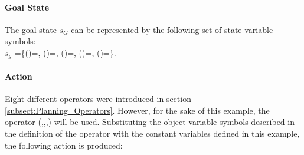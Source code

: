 \begin{comment}
In the initial state $s_0$, the $\mathsf{Robot}$ $\mathrm{r_1}$ is not equipped with any $\mathsf{EndEffector}$ and is not holding anything. The $\mathsf{EndEffectors}$ $\mathrm{eeff_1}$ and $\mathrm{eeff_2}$ are placed in the $\mathsf{EndEffectorHolders}$ $\mathrm{eeffholder_1}$ and $\mathrm{eeffholder_2}$, respectively. The $\mathsf{LargeBoxWithKits}$ $\mathrm{lbwk_1}$ is not full. The $\mathsf{LargeBoxWithEmptyKitTrays}$ $\mathrm{lbwekt_1}$ is not empty. The $\mathsf{PartTrays}$ $\mathrm{pt_A}$, $\mathrm{pt_B}$, and $\mathrm{pt_C}$ are not empty. The $\mathsf{WorkTable}$ $\mathrm{wtable}$ is free of any object.
\end{comment}



\paragraph{Goal State}
\begin{comment}
The goal state $s_g$, the $\mathsf{KitInstance}$ $\mathrm{kins_1}$ contains $\mathsf{Parts}$ $\mathrm{p_{A-1}}$, $\mathrm{p_{A-2}}$, $\mathrm{p_{B-1}}$, and $\mathrm{p_{C-1}}$. The $\mathsf{KitInstance}$ $\mathrm{kins_1}$ is placed in the $\mathsf{LargeBoxWithKits}$ $\mathrm{lbwk_1}$.
\end{comment}
The goal state $s_G$ can be represented by the following set of state variable symbols:\\
$s_g$ =\{()=, ()=, ()=, ()=,   ()=\}.

\paragraph{Action}
Eight different operators were introduced in section \ref{subsect:Planning_Operators}. However, for the sake of this example, the operator (,,,) will be used. Substituting the object variable symbols described in the definition of the operator  with the constant variables defined in this example, the following action is produced:

